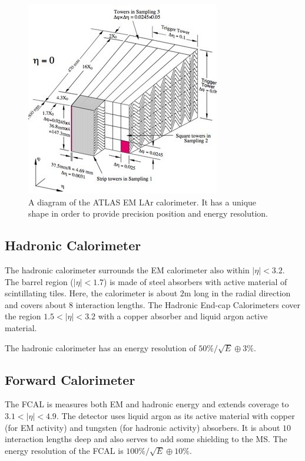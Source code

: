 \begin{figure}[htbp]
\centering
\includegraphics[width=.6\textwidth]{figures/Detector/lar.jpg}
\caption{A diagram of the \ac{ATLAS} \ac{EM} \ac{LAr} calorimeter. It has a unique shape in order to provide precision position and energy resolution.}
\label{fig:atlas-lar}
\end{figure}


\subsection{Hadronic Calorimeter}

The hadronic calorimeter surrounds the \ac{EM} calorimeter also within $|\eta| < 3.2$. The barrel region ($|\eta| < 1.7$) is made of steel absorbers with active material of scintillating tiles. Here, the calorimeter is about $2$m long in the radial direction and covers about $8$ interaction lengths. The Hadronic End-cap Calorimeters cover the region $1.5 < |\eta| < 3.2$ with a copper absorber and liquid argon active material.


The hadronic calorimeter has an energy resolution of  $50\%/\sqrt{E} \oplus 3\%$. 

\subsection{Forward Calorimeter}
The \ac{FCAL} is measures  both \ac{EM} and hadronic energy and extends coverage to $3.1 < |\eta| < 4.9$. The detector uses liquid argon as its active material with copper (for \ac{EM} activity) and tungsten (for hadronic activity) absorbers. It is about $10$ interaction lengths deep and also serves to add some shielding to the \ac{MS}. The energy resolution of the \ac{FCAL} is $100\%/\sqrt{E} \oplus 10\%$.




